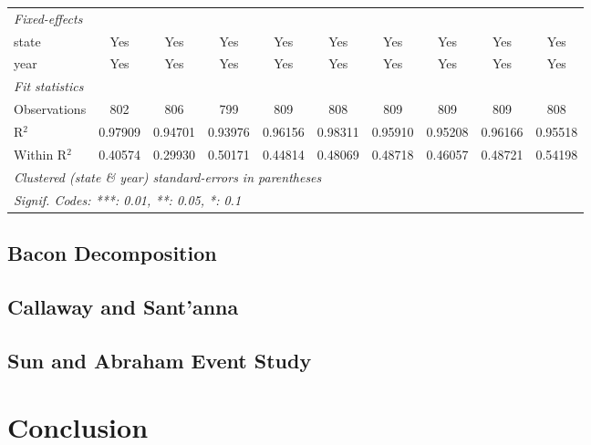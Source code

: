 \documentclass{article}
\begin{document}
\begin{landscape}
\begin{longtable}{@{\extracolsep{5pt}}lccccccccc}
   \midrule
   \emph{Fixed-effects}\\
   state                & Yes                           & Yes                     & Yes                           & Yes                          & Yes                         & Yes                          & Yes                     & Yes                           & Yes\\  
   year                 & Yes                           & Yes                     & Yes                           & Yes                          & Yes                         & Yes                          & Yes                     & Yes                           & Yes\\  
   \midrule
   \emph{Fit statistics}\\
   Observations         & 802                           & 806                     & 799                           & 809                          & 808                         & 809                          & 809                     & 809                           & 808\\  
   R$^2$                & 0.97909                       & 0.94701                 & 0.93976                       & 0.96156                      & 0.98311                     & 0.95910                      & 0.95208                 & 0.96166                       & 0.95518\\  
   Within R$^2$         & 0.40574                       & 0.29930                 & 0.50171                       & 0.44814                      & 0.48069                     & 0.48718                      & 0.46057                 & 0.48721                       & 0.54198\\  
   \midrule \midrule
   \multicolumn{10}{l}{\emph{Clustered (state \& year) standard-errors in parentheses}}\\
   \multicolumn{10}{l}{\emph{Signif. Codes: ***: 0.01, **: 0.05, *: 0.1}}\\
\end{longtable}
\end{landscape}
\restoregeometry
\subsection*{Bacon Decomposition}
\subsection*{Callaway and Sant'anna}
\subsection*{Sun and Abraham Event Study}
\section*{Conclusion} 
\end{document}
